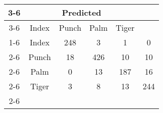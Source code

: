 \documentclass{standalone}
\begin{document}
 
 \begin{tabular}{|c |c |c |c |c |c |}
\cline{3-6}\multicolumn{2}{c|}{} & \multicolumn{4}{c|}{Predicted} \\ 
\cline{3-6} \multicolumn{2}{c |}{ } & Index & Punch & Palm & Tiger\\ 
\cline{1-6}\multirow{4}{*}{\rotatebox[origin=c]{90}{Actual}} & Index & 248 & 3 & 1 & 0\\ 
 \cline{2-6} & Punch & 18 & 426 & 10 & 10\\ 
 \cline{2-6} & Palm & 0 & 13 & 187 & 16\\ 
 \cline{2-6} & Tiger & 3 & 8 & 13 & 244\\ 
 \cline{2-6}\hline \end{tabular}
 
\end{document}
